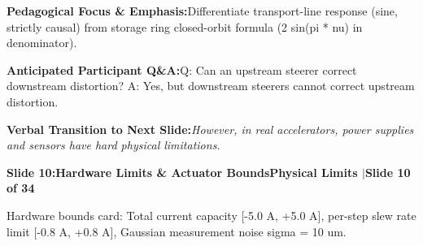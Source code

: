\documentclass[11pt,a4paper]{article}
\begin{document}
\begin{tcolorbox}[colback=lightbg,colframe=bordergray,left=6pt,right=6pt,top=3pt,bottom=3pt,boxrule=0.6pt,arc=2.5pt]
\small
\noindent\textbf{\color{navy}Pedagogical Focus \& Emphasis:}\enspace Differentiate transport-line response (sine, strictly causal) from storage ring closed-orbit formula (2 sin(pi * nu) in denominator).\par\vspace{0.3em}
\noindent\textbf{\color{successgreen}Anticipated Participant Q\&A:}\enspace Q: Can an upstream steerer correct downstream distortion? A: Yes, but downstream steerers cannot correct upstream distortion.\par\vspace{0.3em}
\noindent\textbf{\color{accent}Verbal Transition to Next Slide:}\enspace \emph{However, in real accelerators, power supplies and sensors have hard physical limitations.}
\end{tcolorbox}
\clearpage
\hypertarget{slide.10}{}
{}
\noindent\begin{tcolorbox}[colback=navy,colframe=navy,left=6pt,right=6pt,top=3pt,bottom=3pt,boxrule=0pt,arc=2pt]
{\large\bfseries\color{white}Slide 10:\enspace Hardware Limits \& Actuator Bounds}\hfill{\footnotesize\bfseries\color{white!85!lightbg}Physical Limits \enspace$|$\enspace Slide 10 of 34}
\end{tcolorbox}
\vspace{0.2em}
\begin{tcolorbox}[colback=lightbg,colframe=bordergray,title={\footnotesize\bfseries\color{darkgray}Slide Visual Blueprint},fontupper=\small,left=6pt,right=6pt,top=2.5pt,bottom=2.5pt,boxrule=0.6pt,arc=2.5pt]
Hardware bounds card: Total current capacity [-5.0 A, +5.0 A], per-step slew rate limit [-0.8 A, +0.8 A], Gaussian measurement noise sigma = 10 um.
\end{tcolorbox}
\vspace{0.2em}
\end{document}

